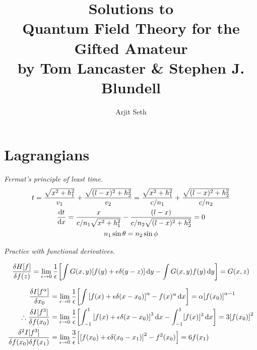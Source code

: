 \documentclass{report}
\begin{document}
\title{Solutions to \\ Quantum Field Theory for the Gifted Amateur \\ by Tom Lancaster \& Stephen J. Blundell}

\author{Arjit Seth}

\maketitle


\chapter{Lagrangians}

\begin{subquests}
	\item \emph{Fermat's principle of least time.}
	\begin{gather*}
		t = \frac{\sqrt{x^2 + h_1^2}}{v_1} + \frac{\sqrt{(l-x)^2+h_2^2}}{v_2} = \frac{\sqrt{x^2 + h_1^2}}{c/n_1} + \frac{\sqrt{(l-x)^2+h_2^2}}{c/n_2} \\
		\dv{t}{x} = \frac{x}{c/n_1\sqrt{x^2 + h_1^2}} - \frac{(l-x)}{c/n_2\sqrt{(l-x)^2 + h_2^2}} = 0 \\
		n_1\sin\theta = n_2\sin\phi
	\end{gather*}
	
	\item \emph{Practice with functional derivatives.}
	\begin{subquests}
		\item
		\begin{gather*}
			\fdv{H[f]}{f(z)} = \lim_{\epsilon \to 0} \frac{1}{\epsilon}\bqty{\int G(x,y)[f(y) + \epsilon\delta(y-z)]\dd{y} - \int G(x,y)f(y)\dd{y}} = G(x,z)
	 	\end{gather*}

	 	\item
	 	\begin{align*}
	 		\fdv{I[f^{\alpha}]}{x_0} & =  \lim_{\epsilon \to 0} \frac{1}{\epsilon}\bqty{\int \bqty{f(x) + \epsilon\delta(x - x_0)}^{\alpha} - f(x)^{\alpha} \dd{x}} = \alpha\bqty{f(x_0)}^{\alpha-1}\\ 
	 		\therefore \fdv{I[f^3]}{f(x_0)} & =  \lim_{\epsilon \to 0} \frac{1}{\epsilon}\bqty{\int_{-1}^1 \bqty{f(x) + \epsilon\delta(x-x_0)}^3\dd{x} -\int_{-1}^1 [f(x)]^3 \dd{x}} = 3\bqty{f(x_0)}^2 \\
			\frac{\delta^2 I[f^3]}{\delta f(x_0)\delta f(x_1)} & = \lim_{\epsilon \to 0} \frac{3}{\epsilon}\bqty{\bqty{f(x_0) + \epsilon\delta(x_0 - x_1)}^2 - f^2(x_0)} =  6f(x_1)
	 	\end{align*}


\end{subquests}
\end{subquests}
\end{document}
